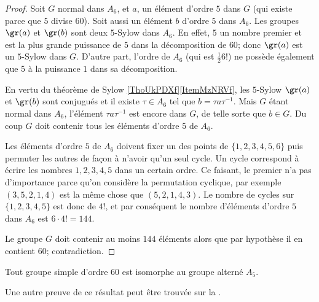 \begin{proof}
    Soit \( G\) normal dans \( A_6\), et \( a\), un élément d'ordre \( 5\) dans \( G\) (qui existe parce que \( 5\) divise \( 60\)). Soit aussi un élément \( b\) d'ordre \( 5\) dans \( A_6\). Les groupes \( \gr(a)\) et \( \gr(b)\) sont deux \( 5\)-Sylow dans \( A_6\). En effet, \( 5\) un nombre premier et est la plus grande puissance de \( 5\) dans la décomposition de \( 60\); donc \( \gr(a)\) est un \( 5\)-Sylow dans \( G\). D'autre part, l'ordre de \( A_6\) (qui est \( \frac{ 1 }{2}6!\)) ne possède également que \( 5\) à la puissance \( 1\) dans sa décomposition.

    En vertu du théorème de Sylow \ref{ThoUkPDXf}\ref{ItemMzNRVf}, les \( 5\)-Sylow \( \gr(a)\) et \( \gr(b)\) sont conjugués et il existe \( \tau\in A_6\) tel que \( b=\tau a\tau^{-1}\). Mais \( G\) étant normal dans \( A_6\), l'élément \( \tau a\tau^{-1}\) est encore dans \( G\), de telle sorte que \( b\in G\). Du coup \( G\) doit contenir tous les éléments d'ordre \( 5\) de \( A_6\).

    Les éléments d'ordre $5$ de \( A_6\) doivent fixer un des points de \( \{ 1,2,3,4,5,6 \}\) puis permuter les autres de façon à n'avoir qu'un seul cycle. Un cycle correspond à écrire les nombres \( 1,2,3,4,5\) dans un certain ordre. Ce faisant, le premier n'a pas d'importance parce qu'on considère la permutation cyclique, par exemple \( (3,5,2,1,4)\) est la même chose que \( (5,2,1,4,3)\). Le nombre de cycles sur \( \{ 1,2,3,4,5 \}\) est donc de \( 4!\), et par conséquent le nombre d'éléments d'ordre \( 5\) dans \( A_6\) est \( 6\cdot 4!=144\).

    Le groupe \( G\) doit contenir au moins \( 144\) éléments alors que par hypothèse il en contient \( 60\); contradiction.
    
\end{proof}

\begin{proposition}
    Tout groupe simple d'ordre \( 60\) est isomorphe au groupe alterné \( A_5\).
\end{proposition}
Une autre preuve de ce résultat peut être trouvée sur la . 


